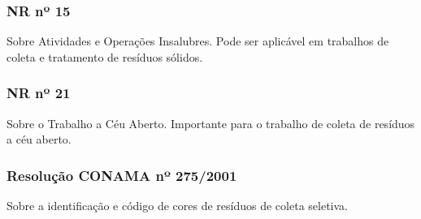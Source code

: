 \begin{subapend}
\begin{subsubapend}
		\subsubsection{NR nº 15}
		Sobre Atividades e Operações Insalubres. Pode ser aplicável em trabalhos de coleta e tratamento de resíduos sólidos.
		\subsubsection{NR nº 21}
		Sobre o Trabalho a Céu Aberto. Importante para o trabalho de coleta de resíduos a céu aberto.
		\subsubsection{Resolução CONAMA nº 275/2001}
		Sobre a identificação e código de cores de resíduos de coleta seletiva.
	\end{subsubapend}
\end{subapend}

